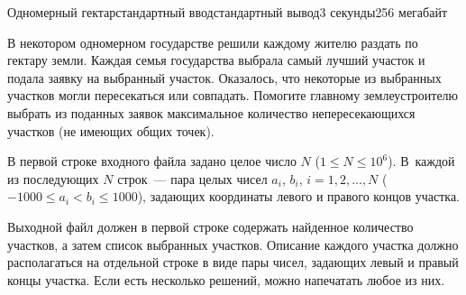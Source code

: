 \begin{problem}{Одномерный гектар}{стандартный ввод}{стандартный вывод}{3 секунды}{256 мегабайт}

В некотором одномерном государстве решили каждому жителю раздать по гектару земли. Каждая семья государства выбрала самый лучший участок и подала заявку на выбранный участок. Оказалось, что некоторые из выбранных участков могли пересекаться или совпадать. Помогите главному землеустроителю выбрать из поданных заявок максимальное количество непересекающихся участков (не имеющих общих точек).

\InputFile
В первой строке входного файла задано целое число $N$ ($1\leqslant N \leqslant 10^6$). В~каждой из последующих $N$ строк~--- пара целых чисел $a_i$, $b_i$, $i=1,2,\ldots,N$ ($-1000\leqslant a_i < b_i \leqslant 1000$), задающих координаты левого и правого концов участка.

\OutputFile
Выходной файл должен в первой строке содержать найденное количество участков, а затем список выбранных участков. Описание каждого участка должно располагаться на отдельной строке в виде пары чисел, задающих левый и правый концы участка. Если есть несколько решений, можно напечатать любое из них.

\Example

\begin{example}
%
\end{example}

\end{problem}

